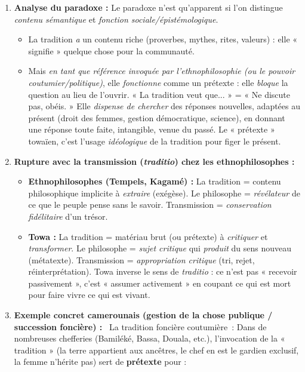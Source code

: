 \documentclass[11pt]{article}
\newcommand{\cle}[1]{{\popxbold\color{popdark}#1}}
\begin{document}
\begin{corrige}
\begin{enumerate}
\item \textbf{Analyse du paradoxe :} Le paradoxe n'est qu'apparent si l'on distingue \emph{contenu sémantique} et \emph{fonction sociale/épistémologique}.
\begin{itemize}
\item La tradition \emph{a} un contenu riche (proverbes, mythes, rites, valeurs) : elle « signifie » quelque chose pour la communauté.
\item Mais \emph{en tant que référence invoquée par l'ethnophilosophie (ou le pouvoir coutumier/politique)}, elle \emph{fonctionne} comme un \cle{prétexte} : elle \emph{bloque} la question au lieu de l'ouvrir. « La tradition veut que... » = « Ne discute pas, obéis. » Elle \emph{dispense de chercher} des réponses nouvelles, adaptées au présent (droit des femmes, gestion démocratique, science), en donnant une réponse toute faite, intangible, venue du passé. Le « prétexte » towaïen, c'est l'usage \emph{idéologique} de la tradition pour figer le présent.
\end{itemize}
\item \textbf{Rupture avec la \cle{transmission} (\emph{traditio}) chez les ethnophilosophes :}
\begin{itemize}
\item \textbf{Ethnophilosophes (Tempels, Kagamé) :} La tradition = \cle{contenu philosophique implicite} à \emph{extraire} (exégèse). Le philosophe = \emph{révélateur} de ce que le peuple pense sans le savoir. Transmission = \emph{conservation fidélitaire} d'un trésor.
\item \textbf{Towa :} La tradition = \cle{matériau brut} (ou prétexte) à \emph{critiquer} et \emph{transformer}. Le philosophe = \emph{sujet critique} qui \emph{produit} du sens nouveau (métatexte). Transmission = \emph{appropriation critique} (tri, rejet, réinterprétation). Towa inverse le sens de \emph{traditio} : ce n'est pas « recevoir passivement », c'est « assumer activement » en coupant ce qui est mort pour faire vivre ce qui est vivant.
\end{itemize}
\item \textbf{Exemple concret camerounais (gestion de la chose publique / succession foncière) :}
\guillemotleft~La tradition foncière coutumière~\guillemotright : Dans de nombreuses chefferies (Bamiléké, Bassa, Douala, etc.), l'invocation de la « tradition » (la terre appartient aux ancêtres, le chef en est le gardien exclusif, la femme n'hérite pas) sert de \textbf{prétexte} pour :

\end{enumerate}
\end{corrige}
\end{document}
